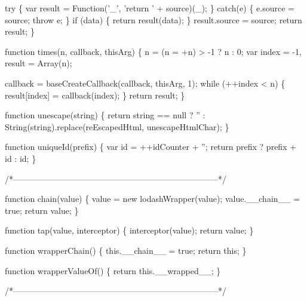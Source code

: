 \begin{DoxyCodeInclude}
{{    \textcolor{keywordflow}{try} \{
      var result = Function(\textcolor{charliteral}{'\_'}, \textcolor{stringliteral}{'return '} + source)(\_);
    \} \textcolor{keywordflow}{catch}(e) \{
      e.source = source;
      \textcolor{keywordflow}{throw} e;
    \}
    \textcolor{keywordflow}{if} (data) \{
      \textcolor{keywordflow}{return} result(data);
    \}
    result.source = source;
    \textcolor{keywordflow}{return} result;
  \}

  \textcolor{keyword}{function} times(n, callback, thisArg) \{
    n = (n = +n) > -1 ? n : 0;
    var index = -1,
        result = Array(n);

    callback = baseCreateCallback(callback, thisArg, 1);
    \textcolor{keywordflow}{while} (++index < n) \{
      result[index] = callback(index);
    \}
    \textcolor{keywordflow}{return} result;
  \}

  \textcolor{keyword}{function} unescape(\textcolor{keywordtype}{string}) \{
    \textcolor{keywordflow}{return} \textcolor{keywordtype}{string} == null ? \textcolor{stringliteral}{''} : String(\textcolor{keywordtype}{string}).replace(reEscapedHtml, unescapeHtmlChar);
  \}

  \textcolor{keyword}{function} uniqueId(prefix) \{
    var \textcolor{keywordtype}{id} = ++idCounter + \textcolor{stringliteral}{''};
    \textcolor{keywordflow}{return} prefix ? prefix + \textcolor{keywordtype}{id} : id;
  \}

  \textcolor{comment}{/*--------------------------------------------------------------------------*/}

  \textcolor{keyword}{function} chain(value) \{
    value = \textcolor{keyword}{new} lodashWrapper(value);
    value.\_\_chain\_\_ = \textcolor{keyword}{true};
    \textcolor{keywordflow}{return} value;
  \}

  \textcolor{keyword}{function} tap(value, interceptor) \{
    interceptor(value);
    \textcolor{keywordflow}{return} value;
  \}

  \textcolor{keyword}{function} wrapperChain() \{
    this.\_\_chain\_\_ = \textcolor{keyword}{true};
    \textcolor{keywordflow}{return} \textcolor{keyword}{this};
  \}

  \textcolor{keyword}{function} wrapperValueOf() \{
    \textcolor{keywordflow}{return} this.\_\_wrapped\_\_;
  \}

  \textcolor{comment}{/*--------------------------------------------------------------------------*/}

}}
\end{DoxyCodeInclude}
